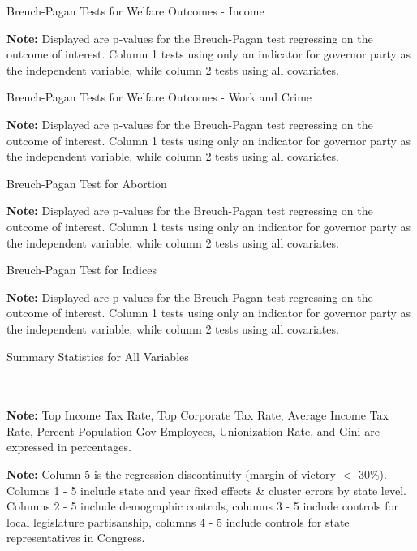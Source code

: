 \documentclass{article}
\begin{document}
\begin{table}[!hbtp]
\caption{Breuch-Pagan Tests for Welfare Outcomes - Income}

\textbf{Note:} Displayed are p-values for the Breuch-Pagan test regressing on the outcome of interest. Column 1 tests using only an indicator for governor party as the independent variable, while column 2 tests using all covariates. 
\label{table:bp_welfare1}
\end{table}

\begin{table}[!hbtp]
\caption{Breuch-Pagan Tests for Welfare Outcomes - Work and Crime}

\textbf{Note:} Displayed are p-values for the Breuch-Pagan test regressing on the outcome of interest. Column 1 tests using only an indicator for governor party as the independent variable, while column 2 tests using all covariates. 
\label{table:bp_welfare2}
\end{table}

\begin{table}[!hbtp]
\caption{Breuch-Pagan Test for Abortion}

\textbf{Note:} Displayed are p-values for the Breuch-Pagan test regressing on the outcome of interest. Column 1 tests using only an indicator for governor party as the independent variable, while column 2 tests using all covariates. 
\label{table:bp_abortion}
\end{table}

\begin{table}[!hbtp]
\caption{Breuch-Pagan Test for Indices}

\textbf{Note:} Displayed are p-values for the Breuch-Pagan test regressing on the outcome of interest. Column 1 tests using only an indicator for governor party as the independent variable, while column 2 tests using all covariates. 
\label{table:bp_index}
\end{table}


\begin{table}[!hbtp]
\caption{Summary Statistics for All Variables}

\\ \\
\textbf{Note:}  Top Income Tax Rate, Top Corporate Tax Rate, Average Income Tax Rate, Percent Population  Gov Employees, Unionization Rate, and Gini are expressed in percentages.
\label{table:summary_long}
\end{table}


\begin{table}[!hbtp]

\textbf{Note:} Column 5 is the regression discontinuity (margin of victory $<$ 30\%). Columns 1 - 5 include state and year fixed effects \& cluster errors by state level. Columns 2 - 5 include demographic controls, columns 3 - 5 include controls for local legislature partisanship, columns 4 - 5 include controls for state representatives in Congress.
\end{table}
\end{document}
